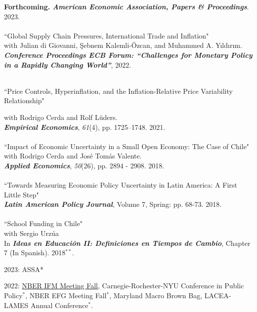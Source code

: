 \documentclass[10pt]{article}
\begin{document}
\begin{description}[leftmargin=10em,style=nextline]
      \textbf{Forthcoming. \textit{American Economic Association, Papers \& Proceedings}}. 2023.\\
     \\[-0.1in]
      ``Global Supply Chain Pressures, International Trade and Inflation"\\
     with Julian di Giovanni, \c{S}ebnem Kalemli-\"{O}zcan, and Muhammed A. Y{\i}ld{\i}r{\i}m. \\
     \textbf{\textit{Conference Proceedings ECB Forum: ``Challenges for Monetary Policy in a Rapidly Changing World''}}, 2022.\\
    \\[-0.2in]
    \item[Pre Ph.D.]
     ``Price Controls, Hyperinflation, and the Inflation-Relative Price Variability Relationship"\\[-.225in]
     \item[Publications]
     with Rodrigo Cerda and Rolf L\"{u}ders. \\
     \textbf{\textit{Empirical Economics}}, \emph{61}(4), pp. 1725--1748. 2021.\\
    \\[-0.1in]
     ``Impact of Economic Uncertainty in a Small Open Economy: The Case of Chile"\\
     with Rodrigo Cerda and Jos\'e Tom\'as Valente. \\
     \textbf{\textit{Applied Economics}}, \textit{50}(26), pp. 2894 - 2908. 2018.\\
    \\[-0.1in]
     ``Towards Measuring Economic Policy Uncertainty in Latin America: A First Little Step" \\
     \textbf{\textit{Latin American Policy Journal}}, Volume 7, Spring: pp. 68-73. 2018.\\
    \\[-0.1in]
     ``School Funding in Chile"\\
     with Sergio Urz\'ua \\
     In  \textbf{\textit{Ideas en Educaci\'on II: Definiciones en Tiempos de Cambio}}, Chapter 7 (In Spanish). 2018$^{**}$.\\[-0.1in]
     \item[Conference] 2023: ASSA*\\[-0.225in]
      \item[Presentations] 2022: \underline{NBER IFM Meeting Fall}, Carnegie-Rochester-NYU Conference in Public Policy$^\ast$, NBER EFG Meeting Fall$^\ast$, Maryland Macro Brown Bag, LACEA-LAMES Annual Conference$^\ast$.\\

\end{description}
\end{document}
